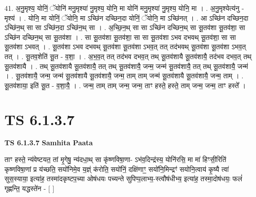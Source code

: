 \documentclass[17pt]{extarticle}
\begin{document}
41. अ॒नु॒मृश्य॒ योनिं॒ ॅयोनि॑ मनु॒मृश्या॑ नु॒मृश्य॒ योनि॒ मा योनि॑ मनु॒मृश्या॑ नु॒मृश्य॒ योनि॒ मा । . अ॒नु॒मृश्येत्य॑नु - मृश्य॑ । . योनि॒ मा योनिं॒ ॅयोनि॒ मा ऽच्छि॑न दच्छिन॒दा योनिं॒ ॅयोनि॒ मा ऽच्छि॑नत् । . आ ऽच्छि॑न दच्छिन॒दा ऽच्छि॑न॒थ् सा सा ऽच्छि॑न॒दा ऽच्छि॑न॒थ् सा । . अ॒च्छि॒न॒थ् सा सा ऽच्छि॑न दच्छिन॒थ् सा सू॒तव॑शा सू॒तव॑शा॒ सा ऽच्छि॑न दच्छिन॒थ् सा सू॒तव॑शा । . सा सू॒तव॑शा सू॒तव॑शा॒ सा सा सू॒तव॑शा ऽभव दभवथ् सू॒तव॑शा॒ सा सा सू॒तव॑शा ऽभवत् । . सू॒तव॑शा ऽभव दभवथ् सू॒तव॑शा सू॒तव॑शा ऽभव॒त् तत् तद॑भवथ् सू॒तव॑शा सू॒तव॑शा ऽभव॒त् तत् । . सू॒तव॒शेति॑ सू॒त - व॒शा॒ । . अ॒भ॒व॒त् तत् तद॑भव दभव॒त् तथ् सू॒तव॑शायै सू॒तव॑शायै॒ तद॑भव दभव॒त् तथ् सू॒तव॑शायै । . तथ् सू॒तव॑शायै सू॒तव॑शायै॒ तत् तथ् सू॒तव॑शायै॒ जन्म॒ जन्म॑ सू॒तव॑शायै॒ तत् तथ् सू॒तव॑शायै॒ जन्म॑ । . सू॒तव॑शायै॒ जन्म॒ जन्म॑ सू॒तव॑शायै सू॒तव॑शायै॒ जन्म॒ ताम् ताम् जन्म॑ सू॒तव॑शायै सू॒तव॑शायै॒ जन्म॒ ताम् । . सू॒तव॑शाया॒ इति॑ सू॒त - व॒शा॒यै॒ । . जन्म॒ ताम् ताम् जन्म॒ जन्म॒ ताꣳ हस्ते॒ हस्ते॒ ताम् जन्म॒ जन्म॒ ताꣳ हस्ते᳚ । \newline
\pagebreak
{}

\section{ TS 6.1.3.7 }

\textbf{TS 6.1.3.7 } \newline
\textbf{Samhita Paata} \newline

ताꣳ हस्ते॒ न्य॑वेष्टयत॒ तां मृ॒गेषु॒ न्य॑दधा॒थ् सा कृ॑ष्णविषा॒णा- ऽभ॑व॒दिन्द्र॑स्य॒ योनि॑रसि॒ मा मा॑ हिꣳसी॒रिति॑ कृष्णविषा॒णां प्र य॑च्छति॒ सयो॑निमे॒व य॒ज्ञ्ं क॑रोति॒ सयो॑निं॒ दक्षि॑णाꣳ॒॒ सयो॑नि॒मिन्द्रꣳ॑ सयोनि॒त्वाय॑ कृ॒ष्यै त्वा॑ सुस॒स्याया॒ इत्या॑ह॒ तस्मा॑दकृष्टप॒च्या ओष॑धयः पच्यन्ते सुपिप्प॒लाभ्य॒-स्त्वौष॑धीभ्य॒ इत्या॑ह॒ तस्मा॒दोष॑धयः॒ फलं॑ गृह्णन्ति॒ यद्धस्ते॑न - [  ] \newline
\end{document}
